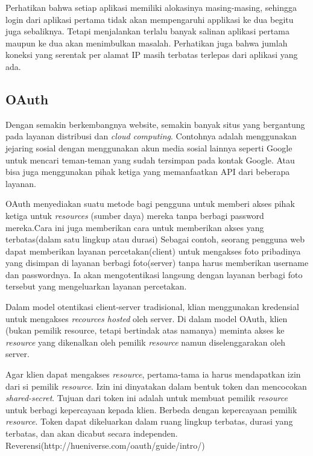 Perhatikan bahwa setiap aplikasi memiliki alokasinya masing-masing, sehingga login dari aplikasi pertama tidak akan mempengaruhi applikasi ke dua begitu juga sebaliknya. Tetapi menjalankan terlalu banyak salinan aplikasi pertama maupun ke dua akan menimbulkan masalah. Perhatikan juga bahwa jumlah koneksi yang serentak per alamat IP masih terbatas terlepas dari aplikasi yang ada.

\subsection{OAuth}
\label{sec:oauth}
Dengan semakin berkembangnya website, semakin banyak situs yang bergantung pada layanan distribusi dan \textit{cloud computing}. Contohnya adalah menggunakan jejaring sosial dengan menggunakan akun media sosial lainnya seperti Google untuk mencari teman-teman yang sudah tersimpan pada kontak Google. Atau bisa juga menggunakan pihak ketiga yang memanfaatkan API dari beberapa layanan.

OAuth menyediakan suatu metode bagi pengguna untuk memberi akses pihak ketiga untuk \textit{resources} (sumber daya) mereka tanpa berbagi password mereka.Cara ini juga memberikan cara untuk memberikan akses yang terbatas(dalam satu lingkup atau durasi) Sebagai contoh, seorang pengguna web dapat memberikan layanan percetakan(client) untuk mengakses foto pribadinya yang disimpan di layanan berbagi foto(server) tanpa harus memberikan username dan passwordnya. Ia akan mengotentikasi langsung dengan layanan berbagi foto tersebut yang mengeluarkan layanan percetakan.

Dalam model otentikasi client-server tradisional, klian menggunakan kredensial untuk mengakses \textit{recources hosted} oleh server. Di dalam model OAuth, klien (bukan pemilik resource, tetapi bertindak atas namanya) meminta akses ke \textit{resource} yang dikenalkan oleh pemilik \textit{resource} namun diselenggarakan oleh server.

Agar klien dapat mengakses \textit{resource}, pertama-tama ia harus mendapatkan izin dari si pemilik \textit{resource}. Izin ini dinyatakan dalam bentuk token dan mencocokan \textit{shared-secret}. Tujuan dari token ini adalah untuk membuat pemilik \textit{resource} untuk berbagi kepercayaan kepada klien. Berbeda dengan kepercayaan pemilik \textit{resource}. Token dapat dikeluarkan dalam ruang lingkup terbatas, durasi yang terbatas, dan akan dicabut secara independen. Reverensi(http://hueniverse.com/oauth/guide/intro/)

